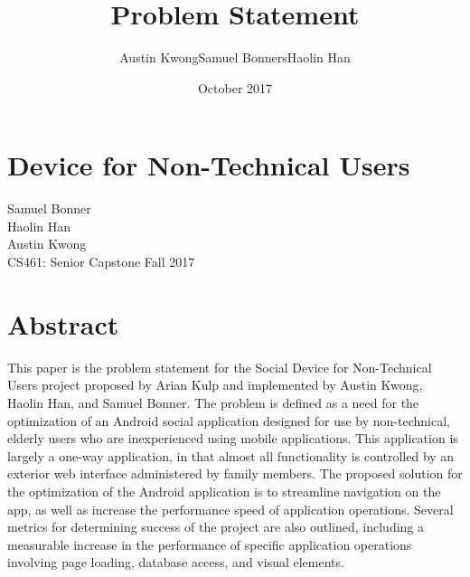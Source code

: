 \documentclass[letterpaper,10pt,draftclsnofoot,onecolumn]{IEEEtran}
\title{\newline\newline\newline Problem Statement}
\author{Austin Kwong\newline Samuel Bonners\newline Haolin Han}
\date{October 2017}
\begin{document}
\clearpage


\section*{\newline\newline\newline Device for Non-Technical Users}
\begin{center}
\vspace{20mm}
Samuel Bonner\\
Haolin Han\\
Austin Kwong\\
\vspace{10mm}
CS461: Senior Capstone Fall 2017
\end{center}

\vfill
\section*{Abstract}
This paper is the problem statement for the Social Device for Non-Technical Users project proposed by Arian Kulp and implemented by Austin Kwong, Haolin Han, and Samuel Bonner. The problem is defined as a need for the optimization of an Android social application designed for use by non-technical, elderly users who are inexperienced using mobile applications. This application is largely a one-way application, in that almost all functionality is controlled by an exterior web interface administered by family members. The proposed solution for the optimization of the Android application is to streamline navigation on the app, as well as increase the performance speed of application operations. Several metrics for determining success of the project are also outlined, including a measurable increase in the performance of specific application operations involving page loading, database access, and visual elements.
\vspace{50mm}

\newpage
\end{document}
